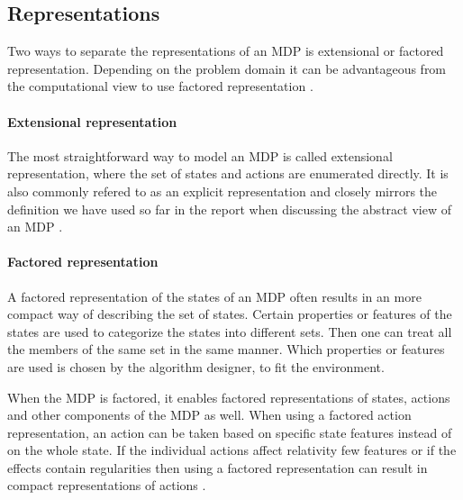 \subsection{Representations}
Two ways to separate the representations of an MDP is extensional or factored representation. Depending on the problem domain it can be advantageous from the computational view to use factored representation \parencite{dean1999descision}.

\paragraph{Extensional representation}
The most straightforward way to model an MDP is called extensional representation, where the set of states and actions are enumerated directly. It is also commonly refered to as an explicit representation and closely mirrors the definition we have used so far in the report when discussing the abstract view of an MDP \parencite{dean1999descision}.

\paragraph{Factored representation} 

A factored representation of the states of an MDP often results in an more
compact way of describing the set of states. Certain properties or features of
the states are used to categorize the states into different sets. Then one can
treat all the members of the same set in the same manner. Which properties or
features are used is chosen by the algorithm designer, to fit the environment.

When the MDP is factored, it enables factored representations of states,
actions and other components of the MDP as well. When using a factored action
representation, an action can be taken based on specific state features instead
of on the whole state. If the individual actions affect relativity few features
or if the effects contain regularities then using a factored representation can
result in compact representations of actions \parencite{dean1999descision}. 
